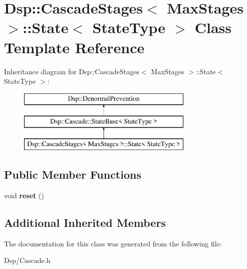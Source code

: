 \hypertarget{classDsp_1_1CascadeStages_1_1State}{\section{Dsp\-:\-:Cascade\-Stages$<$ Max\-Stages $>$\-:\-:State$<$ State\-Type $>$ Class Template Reference}
\label{classDsp_1_1CascadeStages_1_1State}
}
Inheritance diagram for Dsp\-:\-:Cascade\-Stages$<$ Max\-Stages $>$\-:\-:State$<$ State\-Type $>$\-:\begin{figure}[H]
\begin{center}
\leavevmode
\includegraphics[height=3.000000cm]{classDsp_1_1CascadeStages_1_1State}
\end{center}
\end{figure}
\subsection*{Public Member Functions}
\begin{DoxyCompactItemize}
\item 
\hypertarget{classDsp_1_1CascadeStages_1_1State_abdfc4cf2037e12201b92c13b81f77289}{void {\bfseries reset} ()}\label{classDsp_1_1CascadeStages_1_1State_abdfc4cf2037e12201b92c13b81f77289}

\end{DoxyCompactItemize}
\subsection*{Additional Inherited Members}


The documentation for this class was generated from the following file\-:\begin{DoxyCompactItemize}
\item 
Dsp/Cascade.\-h\end{DoxyCompactItemize}
